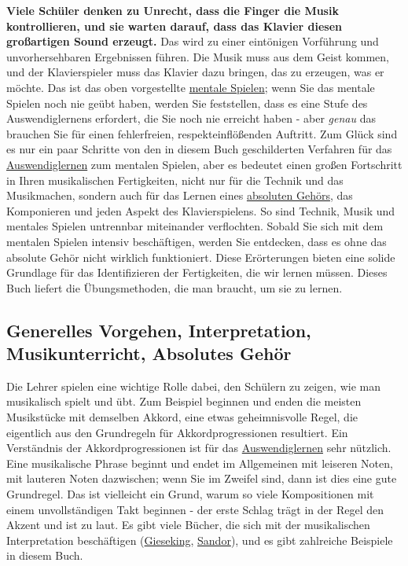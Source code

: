 \textbf{Viele Schüler denken zu Unrecht, dass die Finger die Musik kontrollieren, und sie warten darauf, dass das Klavier diesen großartigen Sound erzeugt.}
Das wird zu einer eintönigen Vorführung und unvorhersehbaren Ergebnissen führen.
Die Musik muss aus dem Geist kommen, und der Klavierspieler muss das Klavier dazu bringen, das zu erzeugen, was er möchte.
Das ist das oben vorgestellte \hyperref[c1ii12mental]{mentale Spielen};
wenn Sie das mentale Spielen noch nie geübt haben, werden Sie feststellen, dass es eine Stufe des Auswendiglernens erfordert, die Sie noch nie erreicht haben - aber \textit{genau} das brauchen Sie für einen fehlerfreien, respekteinflößenden Auftritt.
Zum Glück sind es nur ein paar Schritte von den in diesem Buch geschilderten Verfahren für das \hyperref[c1iii6]{Auswendiglernen} zum mentalen Spielen, aber es bedeutet einen großen Fortschritt in Ihren musikalischen Fertigkeiten, nicht nur für die Technik und das Musikmachen, sondern auch für das Lernen eines \hyperref[c1iii12]{absoluten Gehörs}, das Komponieren und jeden Aspekt des Klavierspielens.
So sind Technik, Musik und mentales Spielen untrennbar miteinander verflochten.
Sobald Sie sich mit dem mentalen Spielen intensiv beschäftigen, werden Sie entdecken, dass es ohne das absolute Gehör nicht wirklich funktioniert.
Diese Erörterungen bieten eine solide Grundlage für das Identifizieren der Fertigkeiten, die wir lernen müssen.
Dieses Buch liefert die Übungsmethoden, die man braucht, um sie zu lernen.


\subsection{Generelles Vorgehen, Interpretation, Musikunterricht, Absolutes Gehör}
\label{c1i4}

Die Lehrer spielen eine wichtige Rolle dabei, den Schülern zu zeigen, wie man musikalisch spielt und übt.
Zum Beispiel beginnen und enden die meisten Musikstücke mit demselben Akkord, eine etwas geheimnisvolle Regel, die eigentlich aus den Grundregeln für Akkordprogressionen resultiert.
Ein Verständnis der Akkordprogressionen ist für das \hyperref[c1iii6]{Auswendiglernen} sehr nützlich.
Eine musikalische Phrase beginnt und endet im Allgemeinen mit leiseren Noten, mit lauteren Noten dazwischen; wenn Sie im Zweifel sind, dann ist dies eine gute Grundregel.
Das ist vielleicht ein Grund, warum so viele Kompositionen mit einem unvollständigen Takt beginnen - der erste Schlag trägt in der Regel den Akzent und ist zu laut.
Es gibt viele Bücher, die sich mit der musikalischen Interpretation beschäftigen (\hyperref[Gieseking]{Gieseking}, \hyperref[Sandor]{Sandor}), und es gibt zahlreiche Beispiele in diesem Buch.

